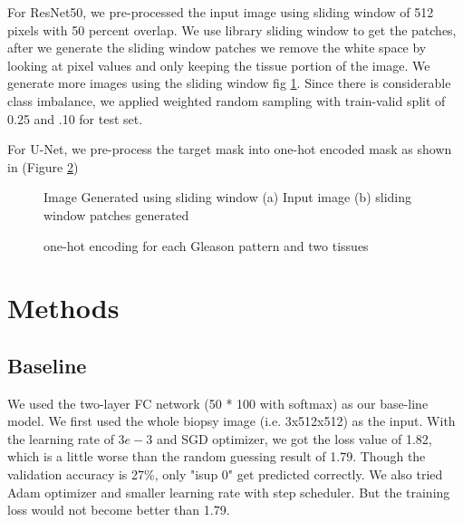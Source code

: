 \documentclass[10pt,twocolumn,letterpaper]{article}
\begin{document}
For ResNet50, we pre-processed the input image using sliding window of 512 pixels with 50 percent overlap. We use library sliding window to get the patches, after we generate the sliding window patches we remove the white space by looking at pixel values and only keeping the tissue portion of the image. We generate more images using the sliding window fig \ref{fig:glued_image}. Since there is considerable class imbalance, we applied weighted random sampling with train-valid split of 0.25 and .10 for test set.

For U-Net, we pre-process the target mask into one-hot encoded mask as shown in (Figure \ref{fig:one_hot})

\begin{figure}[t]
\begin{center}
\end{center}
  \caption{Image Generated using sliding window (a) Input image (b) sliding window patches generated}
\label{fig:glued_image}
\end{figure}

\begin{figure}[t]
\begin{center}
\end{center}
   \caption{one-hot encoding for each Gleason pattern and two tissues}
\label{fig:one_hot}
\end{figure}

\section{Methods}
\subsection{Baseline}
We used the two-layer FC network (50 * 100 with softmax) as our base-line model. We first used the whole biopsy image (i.e. 3x512x512) as the input. With the learning rate of $3e-3$ and SGD optimizer, we got the loss value of 1.82, which is a little worse than the random guessing result of 1.79. Though the validation accuracy is 27\%, only "isup 0" get predicted correctly. We also tried Adam optimizer and smaller learning rate with step scheduler. But the training loss would not become better than 1.79. 
\end{document}
